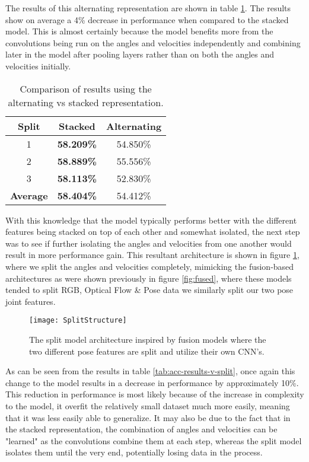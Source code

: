 The results of this alternating representation are shown in table \ref{tab:acc-results-v-alternating}. The results show on average a 4\% decrease in performance when compared to the stacked model. This is almost certainly because the model benefits more from the convolutions being run on the angles and velocities independently and combining later in the model after pooling layers rather than on both the angles and velocities initially.

\begin{table}[ht]
	\centering
	\begin{tabular}{||c c c||} 
		\hline
		\textbf{Split} & \textbf{Stacked} & \textbf{Alternating} \\ [0.5ex] 
		\hline\hline
		1 & \textbf{58.209\%} & 54.850\% \\ 
		\hline
		2 & \textbf{58.889\%} & 55.556\% \\
		\hline
		3 & \textbf{58.113\%} & 52.830\% \\
		\hline
		\hline
		\textbf{Average} & \textbf{58.404\%} & 54.412\% \\
		\hline
	\end{tabular}
	\caption{Comparison of results using the alternating vs stacked representation.}
	\label{tab:acc-results-v-alternating}
\end{table}

With this knowledge that the model typically performs better with the different features being stacked on top of each other and somewhat isolated, the next step was to see if further isolating the angles and velocities from one another would result in more performance gain. This resultant architecture is shown in figure \ref{fig:split-architecture}, where we split the angles and velocities completely, mimicking the fusion-based architectures as were shown previously in figure \ref{fig:fused}, where these models tended to split RGB, Optical Flow \& Pose data we similarly split our two pose joint features.

\begin{figure}[ht]
	\texttt{[image: SplitStructure]}
	\centering
	\caption{The split model architecture inspired by fusion models where the two different pose features are split and utilize their own CNN's.}
	\label{fig:split-architecture}
\end{figure}

As can be seen from the results in table \ref{tab:acc-results-v-split}, once again this change to the model results in a decrease in performance by approximately 10\%. This reduction in performance is most likely because of the increase in complexity to the model, it overfit the relatively small dataset much more easily, meaning that it was less easily able to generalize. It may also be due to the fact that in the stacked representation, the combination of angles and velocities can be "learned" as the convolutions combine them at each step, whereas the split model isolates them until the very end, potentially losing data in the process.

